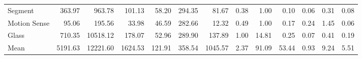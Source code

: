 \begin{tabular}{lrrrrrrrrrrrr}
Segment             &   363.97 &    963.78 &   101.13 &  58.20 &  294.35 &   81.67 &     0.38 &    1.00 &   0.10 &   0.06 &   0.31 &  0.08 \\
Motion Sense        &    95.06 &    195.56 &    33.98 &  46.59 &  282.66 &   12.32 &     0.49 &    1.00 &   0.17 &   0.24 &   1.45 &  0.06 \\
Glass               &   710.35 &  10518.12 &   178.07 &  52.96 &  289.90 &  137.89 &     1.00 &   14.81 &   0.25 &   0.07 &   0.41 &  0.19 \\
Mean                &  5191.63 &  12221.60 &  1624.53 & 121.91 &  358.54 & 1045.57 &     2.37 &   91.09 &  53.44 &   0.93 &   9.24 &  5.51 \\
\bottomrule
\end{tabular}
